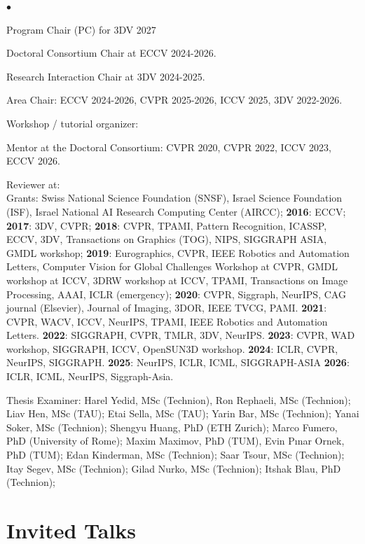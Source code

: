 \documentclass[margin,line]{res}
\newenvironment{list2}{
  \begin{list}{$\bullet$}{%
      \setlength{\itemsep}{0in}
      \setlength{\parsep}{0in} \setlength{\parskip}{0in}
      \setlength{\topsep}{0in} \setlength{\partopsep}{0in}
      \setlength{\leftmargin}{0.2in}}}{\end{list}}
\begin{document}
\begin{resume}
\begin{list2}
\item Program Chair (PC) for 3DV 2027
\item Doctoral Consortium Chair at ECCV 2024-2026. 
\item Research Interaction Chair at 3DV 2024-2025.
\item Area Chair: ECCV 2024-2026, CVPR 2025-2026, ICCV 2025, 3DV 2022-2026.
\item Workshop / tutorial organizer:

\item Mentor at the Doctoral Consortium: CVPR 2020, CVPR 2022, ICCV 2023, ECCV 2026. 
\item Reviewer at: \\
Grants: Swiss National Science Foundation (SNSF), Israel Science Foundation (ISF), Israel National AI Research Computing Center (AIRCC); \textbf{2016}: ECCV; \textbf{2017}: 3DV, CVPR; \textbf{2018}: CVPR, TPAMI, Pattern Recognition, ICASSP, ECCV, 3DV, Transactions on Graphics (TOG), NIPS, SIGGRAPH ASIA, GMDL workshop; \textbf{2019}:  Eurographics, CVPR, IEEE Robotics and Automation Letters, Computer Vision for Global Challenges Workshop at CVPR, GMDL workshop at ICCV, 3DRW workshop at ICCV, TPAMI, Transactions on Image Processing, AAAI, ICLR (emergency); \textbf{2020}: CVPR, Siggraph, NeurIPS, CAG journal (Elsevier), Journal of Imaging, 3DOR, IEEE TVCG, PAMI. \textbf{2021}: CVPR, WACV, ICCV, NeurIPS, TPAMI, IEEE  Robotics  and  Automation  Letters. \textbf{2022}: SIGGRAPH, CVPR, TMLR, 3DV, NeurIPS. \textbf{2023}: CVPR, WAD workshop, SIGGRAPH, ICCV, OpenSUN3D workshop. \textbf{2024}: ICLR, CVPR, NeurIPS, SIGGRAPH. \textbf{2025}: NeurIPS, ICLR, ICML, SIGGRAPH-ASIA \textbf{2026}: ICLR, ICML, NeurIPS, Siggraph-Asia.
\item Thesis Examiner: Harel Yedid, MSc (Technion), Ron Rephaeli, MSc (Technion); Liav Hen, MSc (TAU); Etai Sella, MSc (TAU); Yarin Bar, MSc (Technion); Yanai Soker, MSc (Technion); Shengyu Huang, PhD (ETH Zurich);  Marco Fumero, PhD (University of Rome); Maxim Maximov, PhD (TUM), Evin Pınar Ornek, PhD (TUM); Edan Kinderman, MSc (Technion); Saar Tsour, MSc (Technion); Itay Segev, MSc (Technion); Gilad Nurko, MSc (Technion); Itshak Blau, PhD (Technion);
\end{list2}

\section{\sc Invited Talks}


\end{resume}
\end{document}
